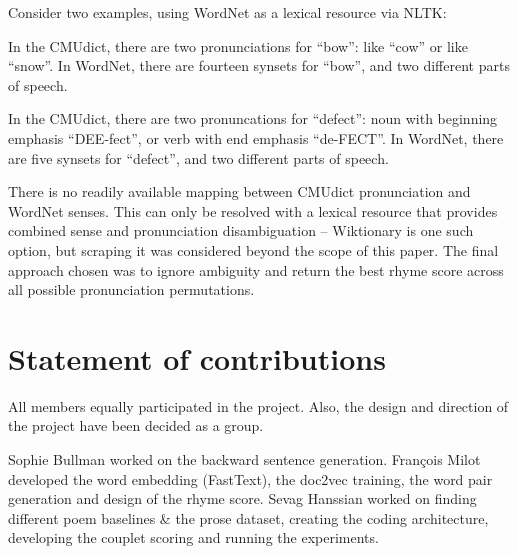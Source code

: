 \documentclass[11pt,a4paper]{article}
\newenvironment{tight_enumerate}{
\begin{enumerate}
\setlength{\itemsep}{0pt}
\setlength{\parskip}{0pt}
}{\end{enumerate}}
\begin{document}
Consider two examples, using WordNet \cite{wordnet} as a lexical resource via NLTK:
\begin{tight_enumerate}
	\vspace{-0.5em}
	\item
		In the CMUdict, there are two pronunciations for ``bow'': like ``cow'' or like ``snow''. In WordNet, there are fourteen synsets for ``bow'', and two different parts of speech.
	\item
		In the CMUdict, there are two pronuncations for ``defect'': noun with beginning emphasis ``DEE-fect'', or verb with end emphasis ``de-FECT''. In WordNet, there are five synsets for ``defect'', and two different parts of speech.
\end{tight_enumerate}

There is no readily available mapping between CMUdict pronunciation and WordNet senses. This can only be resolved with a lexical resource that provides combined sense and pronunciation disambiguation -- Wiktionary \cite{wiktionary} is one such option, but scraping it was considered beyond the scope of this paper. The final approach chosen was to ignore ambiguity and return the best rhyme score across all possible pronunciation permutations.

\section{Statement of contributions}
\label{sec:contributions}
All members equally participated in the project. Also, the design and direction of the project have been decided as a group. 

Sophie Bullman worked on the backward sentence generation. François Milot developed the word embedding (FastText), the doc2vec training, the word pair generation and design of the rhyme score. Sevag Hanssian worked on finding different poem baselines \& the prose dataset, creating the coding architecture, developing the couplet scoring and running the experiments.



\end{document}

